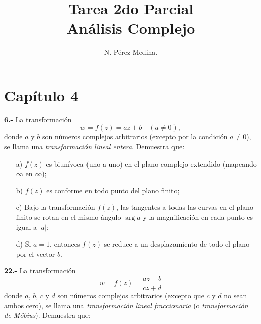 \documentclass[10pt,a4paper]{book}
\title{Tarea 2do Parcial\\Análisis Complejo}
\author{N. Pérez Medina.}
\begin{document}
\maketitle
\newpage
\section*{Capítulo 4}

\textbf{6.- }La transformación
\begin{equation}
    w = f(z) = az + b \quad (a \neq 0),
\end{equation}
donde \(a\) y \(b\) son números complejos arbitrarios (excepto por la condición \(a \neq 0\)), se llama una \textit{transformación lineal entera}. Demuestra que:

\begin{enumerate}
    \item[a)] \(f(z)\) es biunívoca (uno a uno) en el plano complejo extendido (mapeando \(\infty\) en \(\infty\));
    \item[b)] \(f(z)\) es conforme en todo punto del plano finito;
    \item[c)] Bajo la transformación \(f(z)\), las tangentes a todas las curvas en el plano finito se rotan en el mismo ángulo \(\arg a\) y la magnificación en cada punto es igual a \(|a|\);
    \item[d)] Si \(a = 1\), entonces \(f(z)\) se reduce a un desplazamiento de todo el plano por el vector \(b\).
\end{enumerate}

\newpage

\textbf{22.- }La transformación
\begin{equation}
    w = f(z) = \frac{az + b}{cz + d}
\end{equation}
donde \(a\), \(b\), \(c\) y \(d\) son números complejos arbitrarios (excepto que \(c\) y \(d\) no sean ambos cero), se llama una \textit{transformación lineal fraccionaria} (o \textit{transformación de Möbius}). Demuestra que:
\end{document}

